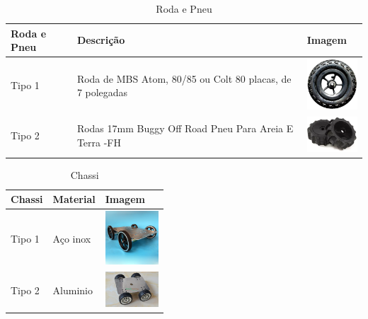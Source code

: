   \begin{table}[!htbp]
  \begin{center}
  \caption{Roda e Pneu}
  \begin{tabular}{|p{2cm}|p{3cm}|p{2cm}|}
  \hline
  \textbf{Roda e Pneu} & \textbf{Descrição} & \textbf{Imagem}\\\hline\hline
  Tipo 1 & Roda de MBS Atom, 80/85 ou Colt 80 placas, de 7 polegadas & \includegraphics[width=2cm]{figuras/roda_mbs.eps}\\\hline
  Tipo 2 & Rodas 17mm Buggy Off Road Pneu Para Areia E Terra -FH & \includegraphics[width=2cm]{figuras/roda_buggy.eps}\\\hline
  \end{tabular}
  \end{center}
  \end{table}

  \begin{table}[!htbp]
  \begin{center}
  \caption{Chassi}
  \begin{tabular}{|p{2cm}|p{3cm}|p{2cm}|}
  \hline
  \textbf{Chassi} & \textbf{Material} & \textbf{Imagem}\\\hline\hline
  Tipo 1 & Aço inox & \includegraphics[width=2cm]{figuras/chassi_inox.eps}\\\hline
  Tipo 2 & Aluminio & \includegraphics[width=2cm]{figuras/chassi_aluminio.eps}\\\hline
  \end{tabular}
  \end{center}
  \end{table}

